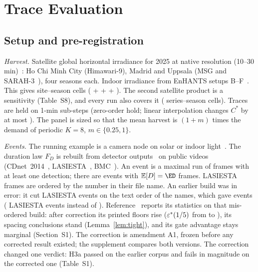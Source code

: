 \section{Trace Evaluation}\label{sec:eval}
\subsection{Setup and pre-registration}\label{sec:setup}
\emph{Harvest.} Satellite global horizontal irradiance for 2025 at native resolution (10--30\,min)~\cite{zippenfeld2023openmeteo}: Ho Chi Minh City (Himawari-9), Madrid and Uppsala (MSG and SARAH-3~\cite{pfeifroth2023sarah3}), four seasons each. Indoor irradiance from EnHANTS setups B--F~\cite{enhants2011dataset}. This gives \nCellsSS{} site--season cells (\nCellHCMC{} + \nCellMadS{} + \nCellUppS{} + \nCellIn). The second satellite product is a sensitivity (Table~S8), and every run also covers it (\nTraceCells{} series--season cells). Traces are held on 1-min sub-steps (zero-order hold; linear interpolation changes $C^*$ by at most \interpMax). The panel is sized so that the mean harvest is $(1+m)$ times the demand of periodic $K=8$, $m\in\{0.25,1\}$.

\emph{Events.} The running example is a camera node on solar or indoor light~\cite{desai2022camaroptera,mayer2024iotj}. The duration law $F_D$ is rebuilt from detector outputs~\cite{ultralytics_yolo} on \nVid{} public videos (CDnet~2014~\cite{wang2014cdnet}, LASIESTA~\cite{cuevas2016lasiesta}, BMC~\cite{vacavant2013bmc}). An event is a maximal run of frames with at least one detection; there are \nEv{} events with $\E[D]=\ED$ frames. LASIESTA frames are ordered by the number in their file name. An earlier build was in error: it cut LASIESTA events on the text order of the names, which gave \VoneNev{} events (\VoneLas{} LASIESTA events instead of \VtwoLas). Reference~\cite{deep3_jiot2026} reports its statistics on that mis-ordered build: after correction its printed floors rise ($\varepsilon^*(1/5)$ from \FloorFiveOld{} to \FloorFiveNew), its spacing conclusions stand (Lemma~\ref{lem:tight}), and its gate advantage stays marginal (Section~S1). The correction is amendment A1, frozen before any corrected result existed; the supplement compares both versions. The correction changed one verdict: H3a passed on the earlier corpus and fails in magnitude on the corrected one (Table~S1).

